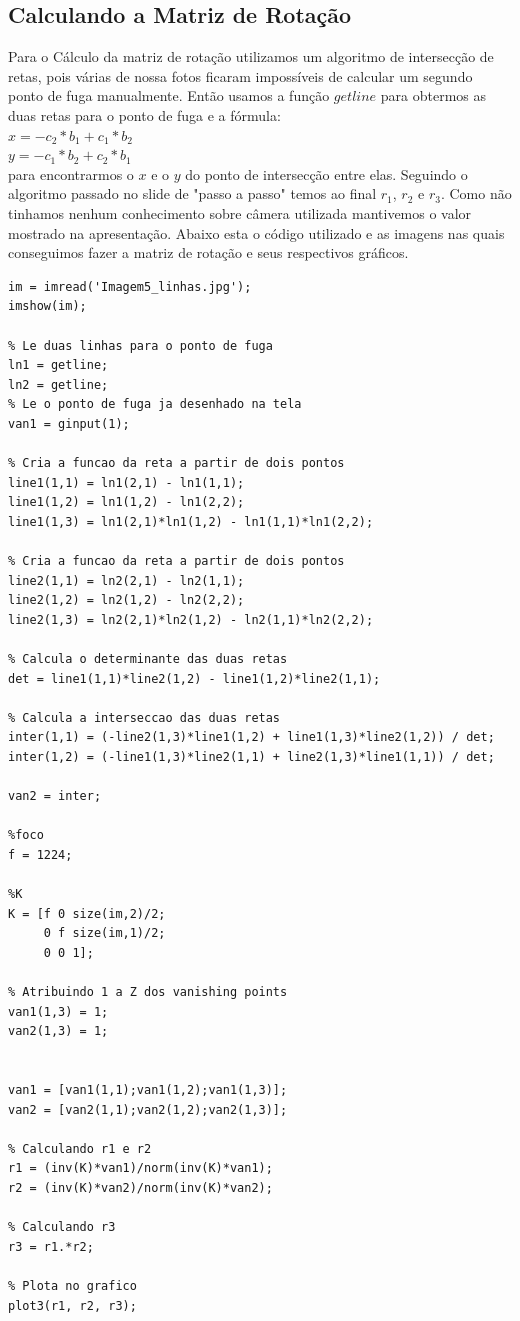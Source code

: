 \documentclass[a4paper, 12pt]{article}
\begin{document}
	\subsection{Calculando a Matriz de Rotação}
	Para o Cálculo da matriz de rotação utilizamos um algoritmo de intersecção de retas, pois várias de nossa fotos ficaram impossíveis de calcular um segundo ponto de fuga manualmente.
	Então usamos a função $getline$ para obtermos as duas retas para o ponto de fuga e a fórmula:
	\\
	$x = -c_2*b_1 + c_1*b_2$
	\\
	$y = -c_1*b_2 + c_2*b_1$
	\\
	para encontrarmos o $x$ e o $y$ do ponto de intersecção entre elas.
	Seguindo o algoritmo passado no slide de "passo a passo" temos ao final $r_1$, $r_2$ e $r_3$.
	Como não tinhamos nenhum conhecimento sobre câmera utilizada mantivemos o valor mostrado na apresentação.
	Abaixo esta o código utilizado e as imagens nas quais conseguimos fazer a matriz de rotação e seus respectivos gráficos.
	\\
	\begin{lstlisting}[frame=single]
im = imread('Imagem5_linhas.jpg');
imshow(im);

% Le duas linhas para o ponto de fuga
ln1 = getline;
ln2 = getline;
% Le o ponto de fuga ja desenhado na tela
van1 = ginput(1);

% Cria a funcao da reta a partir de dois pontos
line1(1,1) = ln1(2,1) - ln1(1,1);
line1(1,2) = ln1(1,2) - ln1(2,2);
line1(1,3) = ln1(2,1)*ln1(1,2) - ln1(1,1)*ln1(2,2);

% Cria a funcao da reta a partir de dois pontos
line2(1,1) = ln2(2,1) - ln2(1,1);
line2(1,2) = ln2(1,2) - ln2(2,2);
line2(1,3) = ln2(2,1)*ln2(1,2) - ln2(1,1)*ln2(2,2);

% Calcula o determinante das duas retas
det = line1(1,1)*line2(1,2) - line1(1,2)*line2(1,1);

% Calcula a interseccao das duas retas
inter(1,1) = (-line2(1,3)*line1(1,2) + line1(1,3)*line2(1,2)) / det;
inter(1,2) = (-line1(1,3)*line2(1,1) + line2(1,3)*line1(1,1)) / det;

van2 = inter;

%foco
f = 1224;

%K
K = [f 0 size(im,2)/2;
     0 f size(im,1)/2;
     0 0 1];

% Atribuindo 1 a Z dos vanishing points
van1(1,3) = 1;
van2(1,3) = 1;


van1 = [van1(1,1);van1(1,2);van1(1,3)];
van2 = [van2(1,1);van2(1,2);van2(1,3)];

% Calculando r1 e r2
r1 = (inv(K)*van1)/norm(inv(K)*van1);
r2 = (inv(K)*van2)/norm(inv(K)*van2);

% Calculando r3
r3 = r1.*r2;

% Plota no grafico
plot3(r1, r2, r3);
	\end{lstlisting}
\end{document}
